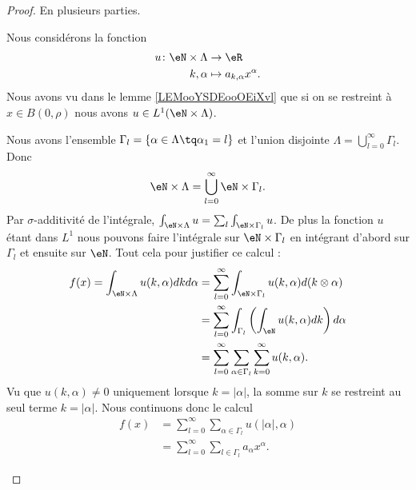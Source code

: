 \begin{proof}
	En plusieurs parties.
	\begin{subproof}
		\spitem[La fonction \( u\)]
		Nous considérons la fonction
		\begin{equation}
			\begin{aligned}
				u\colon \eN\times \Lambda & \to \eR                          \\
				k,\alpha                  & \mapsto  a_{k,\alpha}x^{\alpha}.
			\end{aligned}
		\end{equation}
		Nous avons vu dans le lemme \ref{LEMooYSDEooOEiXvl} que si on se restreint à \( x\in B(0,\rho)\) nous avons \( u\in L^1(\eN\times \Lambda)\).

		Nous avons l'ensemble \( \Gamma_l=\{ \alpha\in \Lambda\tq \alpha_1=l \}\) et l'union disjointe \( \Lambda=\bigcup_{l=0}^{\infty}\Gamma_l\). Donc
		\begin{equation}
			\eN\times \Lambda=\bigcup_{l=0}^{\infty}\eN\times \Gamma_l.
		\end{equation}
		Par \( \sigma\)-additivité de l'intégrale, \( \int_{\eN\times \Lambda}u=\sum_l\int_{\eN\times \Gamma_l}u\). De plus la fonction \( u\) étant dans \( L^1\) nous pouvons faire l'intégrale sur \( \eN\times\Gamma_l\) en intégrant d'abord sur \( \Gamma_l\) et ensuite sur \( \eN\). Tout cela pour justifier ce calcul :
		\begin{subequations}
			\begin{align}
				f(x)=\int_{\eN\times \Lambda}u(k,\alpha)dkd\alpha & =\sum_{l=0}^{\infty}\int_{\eN\times \Gamma_l}u(k,\alpha)d(k\otimes \alpha)       \\
				                                                  & =\sum_{l=0}^{\infty}\int_{\Gamma_l}\left( \int_{\eN}u(k,\alpha)dk \right)d\alpha \\
				                                                  & =\sum_{l=0}^{\infty}\sum_{\alpha\in\Gamma_l}\sum_{k=0}^{\infty}u(k,\alpha).
			\end{align}
		\end{subequations}
		Vu que \( u(k,\alpha)\neq 0\) uniquement lorsque \( k=| \alpha |\), la somme sur \( k\) se restreint au seul terme \( k=| \alpha |\). Nous continuons donc le calcul
		\begin{subequations}
			\begin{align}
				f(x) & =\sum_{l=0}^{\infty}\sum_{\alpha\in \Gamma_l}u(| \alpha |,\alpha) \\
				     & =\sum_{l=0}^{\infty}\sum_{l\in\Gamma_l}a_{\alpha}x^{\alpha}.
			\end{align}
		\end{subequations}
	\end{subproof}
\end{proof}

